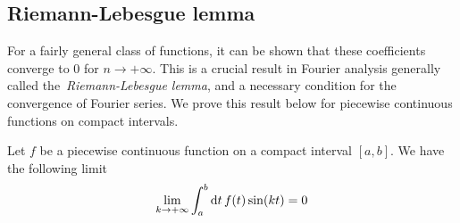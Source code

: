 \subsection{Riemann-Lebesgue lemma}
For a fairly general class of functions, it can be shown that these coefficients converge
to $0$ for $n\to+\infty$. This is a crucial result in Fourier analysis generally called
the~\emph{Riemann-Lebesgue lemma}, and a necessary condition for the convergence of
Fourier series. We prove this result below for piecewise continuous functions on compact
intervals.
\begin{theorem}
  \label{thm:rl}
  Let $f$ be a piecewise continuous function on a compact interval $[a,b]$. We have the
  following limit
  \begin{equation}
    \lim_{k\to+\infty}\int_a^b\mathrm{d} t\, f(t)\sin(kt)=0
  \end{equation}
\end{theorem}
